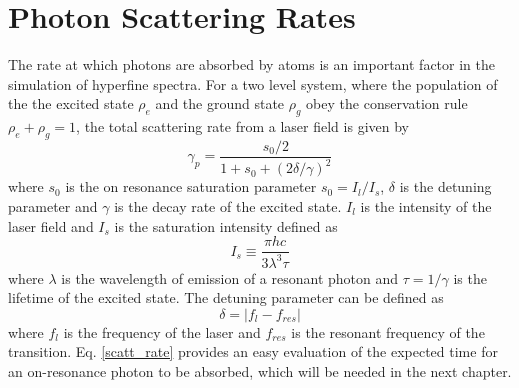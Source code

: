 \section{Photon Scattering Rates}
The rate at which photons are absorbed by atoms is an important factor in the simulation of hyperfine spectra. For a two level system, where the population of the the excited state $\rho_{e}$ and the ground state $\rho_{g}$ obey the conservation rule $\rho_e +\rho_g = 1$, the total scattering rate from a laser field is given by
\begin{equation}
\gamma_p =  \frac{s_0/2}{1+s_0+(2\delta/\gamma)^2}
\label{scatt_rate}
\end{equation}
where $s_0$ is the on resonance saturation parameter $s_0 = I_l/I_s$, $\delta$ is the detuning parameter and $\gamma$ is the decay rate of the excited state. $I_l$ is the intensity of the laser field and $I_s$ is the saturation intensity defined as
\begin{equation}
I_s \equiv \frac{\pi h c}{3 \lambda^3 \tau}
\end{equation}
where $\lambda$ is the wavelength of emission of a resonant photon and $\tau = 1/\gamma$ is the lifetime of the excited state. The detuning parameter can be defined as
\begin{equation}
\delta =|f_{l} - f_{res}|
\end{equation}
where $f_l$ is the frequency of the laser and $f_{res}$ is the resonant frequency of the transition\cite{LasCool}. Eq. \ref{scatt_rate} provides an easy evaluation of the expected time for an on-resonance photon to be absorbed, which will be needed in the next chapter.

